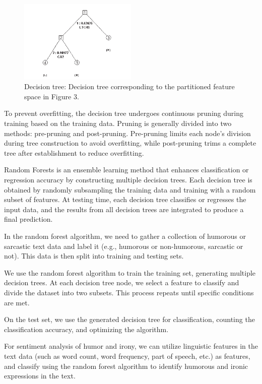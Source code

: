 \documentclass[a4paper]{article}
\begin{document}
\begin{figure}[H]
	\centering
	\includegraphics[width=0.5\textwidth]{./images/Decision tree.png}
	\caption{Decision tree: Decision tree corresponding to the partitioned feature space in Figure 3.}
	\label{fig.Decision tree[An introduction to decision tree modeling]}
\end{figure}

To prevent overfitting, the decision tree undergoes continuous pruning during training based on the training data. Pruning is generally divided into two methods: pre-pruning and post-pruning. Pre-pruning limits each node's division during tree construction to avoid overfitting, while post-pruning trims a complete tree after establishment to reduce overfitting.

Random Forests is an ensemble learning method that enhances classification or regression accuracy by constructing multiple decision trees. Each decision tree is obtained by randomly subsampling the training data and training with a random subset of features. At testing time, each decision tree classifies or regresses the input data, and the results from all decision trees are integrated to produce a final prediction.

In the random forest algorithm, we need to gather a collection of humorous or sarcastic text data and label it (e.g., humorous or non-humorous, sarcastic or not). This data is then split into training and testing sets.

We use the random forest algorithm to train the training set, generating multiple decision trees. At each decision tree node, we select a feature to classify and divide the dataset into two subsets. This process repeats until specific conditions are met.

On the test set, we use the generated decision tree for classification, counting the classification accuracy, and optimizing the algorithm.

For sentiment analysis of humor and irony, we can utilize linguistic features in the text data (such as word count, word frequency, part of speech, etc.) as features, and classify using the random forest algorithm to identify humorous and ironic expressions in the text.
\end{document}
